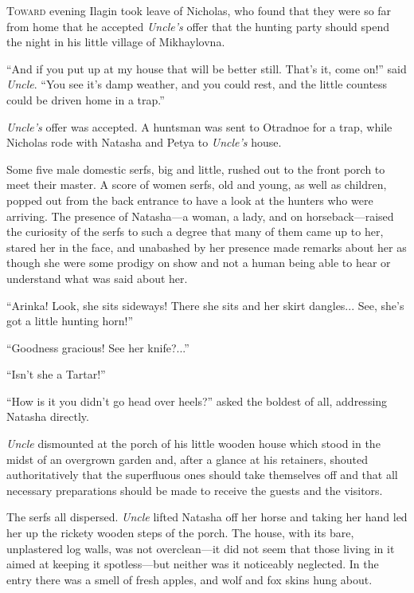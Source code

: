 \lettrine[lines=2, loversize=0.3, lraise=0]{\initfamily T}{oward}
evening Ilagin took leave of Nicholas, who found that they
were so far from home that he accepted \emph{Uncle's} offer that
the hunting party should spend the night in his little village of
Mikhaylovna.

``And if you put up at my house that will be better still. That's
it, come on!'' said \emph{Uncle}. ``You see it's damp weather,
and you could rest, and the little countess could be driven home
in a trap.''

\emph{Uncle's} offer was accepted. A huntsman was sent to
Otradnoe for a trap, while Nicholas rode with Natasha and Petya
to \emph{Uncle's} house.

Some five male domestic serfs, big and little, rushed out to the
front porch to meet their master. A score of women serfs, old and
young, as well as children, popped out from the back entrance to
have a look at the hunters who were arriving. The presence of
Natasha---a woman, a lady, and on horseback---raised the
curiosity of the serfs to such a degree that many of them came up
to her, stared her in the face, and unabashed by her presence
made remarks about her as though she were some prodigy on show
and not a human being able to hear or understand what was said
about her.

``Arinka! Look, she sits sideways! There she sits and her skirt
dangles... See, she's got a little hunting horn!''

``Goodness gracious! See her knife?...''

``Isn't she a Tartar!''

``How is it you didn't go head over heels?'' asked the boldest of
all, addressing Natasha directly.

\emph{Uncle} dismounted at the porch of his little wooden house
which stood in the midst of an overgrown garden and, after a
glance at his retainers, shouted authoritatively that the
superfluous ones should take themselves off and that all
necessary preparations should be made to receive the guests and
the visitors.

The serfs all dispersed. \emph{Uncle} lifted Natasha off her
horse and taking her hand led her up the rickety wooden steps of
the porch. The house, with its bare, unplastered log walls, was
not overclean---it did not seem that those living in it aimed at
keeping it spotless---but neither was it noticeably neglected. In
the entry there was a smell of fresh apples, and wolf and fox
skins hung about.

